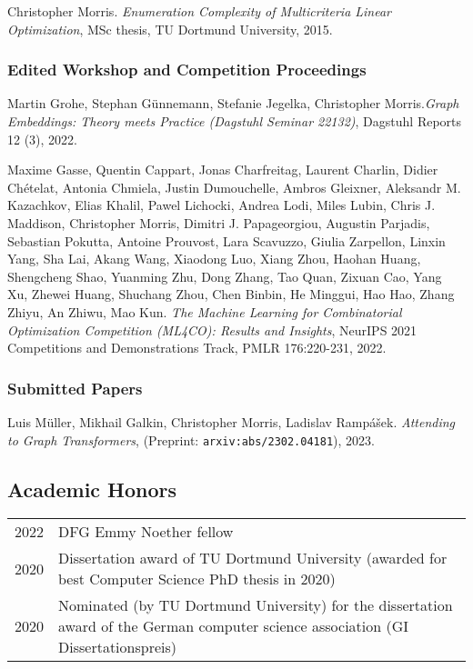 \documentclass[11pt, a4paper, DIV=14, headings=small]{scrartcl}
\begin{document}
\begin{thebibliography}{15}
		Christopher Morris.
		\emph{Enumeration Complexity of Multicriteria Linear Optimization}, MSc thesis, TU Dortmund University, 2015.
		
		\subsubsection*{Edited Workshop and Competition Proceedings}
		
		Martin Grohe, Stephan Günnemann, Stefanie Jegelka, Christopher Morris.\footnotemark[2]
		\emph{Graph Embeddings: Theory meets Practice (Dagstuhl Seminar 22132)},
		Dagstuhl Reports 12 (3), 2022.
		
		Maxime Gasse, Quentin Cappart, Jonas Charfreitag, Laurent Charlin, Didier Chételat, Antonia Chmiela, Justin Dumouchelle, Ambros Gleixner, Aleksandr M. Kazachkov, Elias Khalil, Pawel Lichocki, Andrea Lodi, Miles Lubin, Chris J. Maddison, Christopher Morris, Dimitri J. Papageorgiou, Augustin Parjadis, Sebastian Pokutta, Antoine Prouvost, Lara Scavuzzo, Giulia Zarpellon, Linxin Yang, Sha Lai, Akang Wang, Xiaodong Luo, Xiang Zhou, Haohan Huang, Shengcheng Shao, Yuanming Zhu, Dong Zhang, Tao Quan, Zixuan Cao, Yang Xu, Zhewei Huang, Shuchang Zhou, Chen Binbin, He Minggui, Hao Hao, Zhang Zhiyu, An Zhiwu, Mao Kun.
		\emph{The Machine Learning for Combinatorial Optimization Competition (ML4CO): Results and Insights}, NeurIPS 2021 Competitions and Demonstrations Track, PMLR 176:220-231, 2022.
		
		\subsubsection*{Submitted Papers}
		
		Luis Müller, Mikhail Galkin, Christopher Morris, Ladislav Rampášek.
		\emph{Attending to Graph Transformers}, (Preprint: \texttt{arxiv:abs/2302.04181}), 2023.
	\end{thebibliography}
	
	\subsection*{Academic Honors}
	\tabulinesep=0.8mm
	\begin{longtabu}{p{2.1cm}p{12.0cm}}
		2022 & DFG Emmy Noether fellow                                                                                                             \\
		2020 & Dissertation award of TU Dortmund University (awarded for best Computer Science PhD thesis in 2020)                                 \\
		2020 & Nominated (by TU Dortmund University) for the dissertation award of the German computer science association (GI Dissertationspreis) \\
	\end{longtabu}
	
\end{document}
